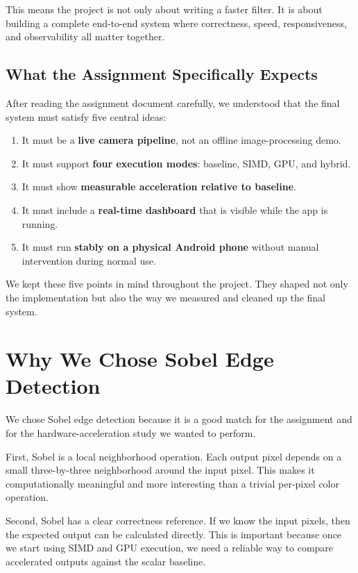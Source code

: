 \documentclass[12pt,a4paper]{article}
\begin{document}
This means the project is not only about writing a faster filter. It is about building a complete end-to-end system where correctness, speed, responsiveness, and observability all matter together.

\subsection{What the Assignment Specifically Expects}

After reading the assignment document carefully, we understood that the final system must satisfy five central ideas:

\begin{enumerate}
\item It must be a \textbf{live camera pipeline}, not an offline image-processing demo.
\item It must support \textbf{four execution modes}: baseline, SIMD, GPU, and hybrid.
\item It must show \textbf{measurable acceleration relative to baseline}.
\item It must include a \textbf{real-time dashboard} that is visible while the app is running.
\item It must run \textbf{stably on a physical Android phone} without manual intervention during normal use.
\end{enumerate}

We kept these five points in mind throughout the project. They shaped not only the implementation but also the way we measured and cleaned up the final system.

\section{Why We Chose Sobel Edge Detection}

We chose Sobel edge detection because it is a good match for the assignment and for the hardware-acceleration study we wanted to perform.

First, Sobel is a local neighborhood operation. Each output pixel depends on a small three-by-three neighborhood around the input pixel. This makes it computationally meaningful and more interesting than a trivial per-pixel color operation.

Second, Sobel has a clear correctness reference. If we know the input pixels, then the expected output can be calculated directly. This is important because once we start using SIMD and GPU execution, we need a reliable way to compare accelerated outputs against the scalar baseline.
\end{document}
